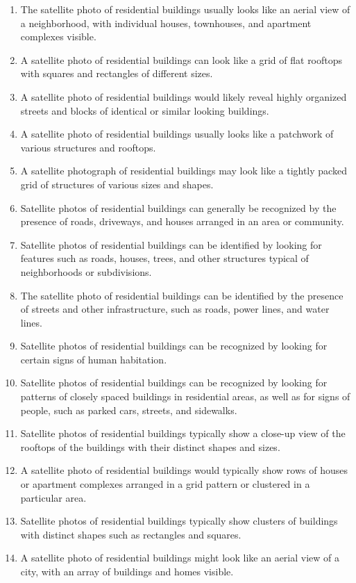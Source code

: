 \documentclass[11pt]{article}
\begin{document}
\begin{enumerate}
\item The satellite photo of residential buildings usually looks like an aerial view of a neighborhood, with individual houses, townhouses, and apartment complexes visible.
\item A satellite photo of residential buildings can look like a grid of flat rooftops with squares and rectangles of different sizes.
\item A satellite photo of residential buildings would likely reveal highly organized streets and blocks of identical or similar looking buildings.
\item A satellite photo of residential buildings usually looks like a patchwork of various structures and rooftops.
\item A satellite photograph of residential buildings may look like a tightly packed grid of structures of various sizes and shapes.
\item Satellite photos of residential buildings can generally be recognized by the presence of roads, driveways, and houses arranged in an area or community.
\item Satellite photos of residential buildings can be identified by looking for features such as roads, houses, trees, and other structures typical of neighborhoods or subdivisions.
\item The satellite photo of residential buildings can be identified by the presence of streets and other infrastructure, such as roads, power lines, and water lines.
\item Satellite photos of residential buildings can be recognized by looking for certain signs of human habitation.
\item Satellite photos of residential buildings can be recognized by looking for patterns of closely spaced buildings in residential areas, as well as for signs of people, such as parked cars, streets, and sidewalks.
\item Satellite photos of residential buildings typically show a close-up view of the rooftops of the buildings with their distinct shapes and sizes.
\item A satellite photo of residential buildings would typically show rows of houses or apartment complexes arranged in a grid pattern or clustered in a particular area.
\item Satellite photos of residential buildings typically show clusters of buildings with distinct shapes such as rectangles and squares.
\item A satellite photo of residential buildings might look like an aerial view of a city, with an array of buildings and homes visible.

\end{enumerate}
\end{document}
